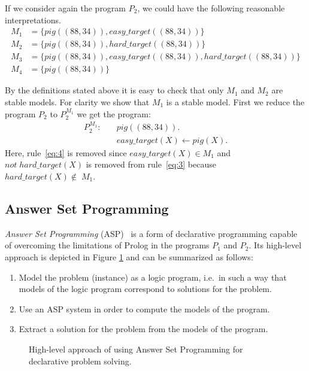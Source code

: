 If we consider again the program \(P_2\), we could have the following reasonable interpretations.
\begin{align*}
M_1&= \{pig((88,34)), \mathit{easy\_target}((88,34))\}  \\
M_2&= \{pig((88,34)), \mathit{hard\_target}((88,34))\} \\
M_3&= \{pig((88,34)), \mathit{easy\_target}((88,34)), \mathit{hard\_target}((88,34))\} \\
M_4&= \{pig((88,34))\}
\end{align*}

By the definitions stated above it is easy to check that only \(M_1\) and \(M_2\) are stable models. For clarity we show that \(M_1\) is a stable model. First we reduce the program \(P_2\) to \(P_2^{M_1}\) we get the program:
\begin{align}
P_2^{M_1} \colon \quad
&pig((88,34)). \\
&\mathit{easy\_target}(X) \leftarrow pig(X). 
\end{align}
Here, rule~\eqref{eq:4} is removed since \(\mathit{easy\_target}(X) \in M_1\) and \(not\; \mathit{hard\_target}(X)\) is removed from rule~\eqref{eq:3} because \(\mathit{hard\_target}(X) \notin\; M_1\).
\subsection{Answer Set Programming}

\emph{Answer Set Programming} (ASP)~\cite{aspPrime} is a form of declarative programming 
capable of overcoming the limitations of Prolog in the programs \(P_1\) and \(P_2\).
Its high-level approach is depicted in Figure \ref{fig:ASP1} and can be summarized as follows:
\begin{enumerate}
\item Model the problem (instance) as a logic program, i.e.~in such a way that models of the logic program correspond to solutions for the problem.
\item Use an ASP system in order to compute the models of the program.
\item Extract a solution for the problem from the models of the program.
\end{enumerate}
\begin{figure}
  \begin{center}
  \end{center}
  \caption{High-level approach of using Answer Set Programming for declarative problem solving.}
  \label{fig:ASP1}
\end{figure}
 
